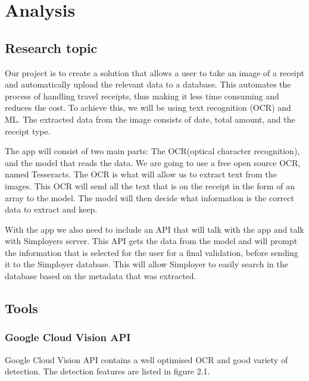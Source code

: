 \cleardoublepage
\chapter{Analysis}
\label{ch:analysis}

\section{Research topic}\label{sec:research-topic}

Our project is to create a solution that allows a user to take an image of a receipt and automatically upload the relevant data to a database.
This automates the process of handling travel receipts, thus making it less time consuming and reduces the cost.
To achieve this, we will be using text recognition (OCR) and ML\@.
The extracted data from the image consists of date, total amount, and the receipt type.

The app will consist of two main parts: The OCR(optical character recognition), and the model that reads the data.
We are going to use a free open source OCR, named Tesseracts.
The OCR is what will allow us to extract text from the images.
This OCR will send all the text that is on the receipt in the form of an array to the model.
The model will then decide what information is the correct data to extract and keep.

With the app we also need to include an API that will talk with the app and talk with Simployers server.
This API gets the data from the model and will prompt the information that is selected for the user for a final
validation, before sending it to the Simployer database.
This will allow Simployer to easily search in the database based on the metadata that was extracted.

\section{Tools}\label{sec:tools}
\subsection{Google Cloud Vision API}\label{subsec:API_Google}

Google Cloud Vision API contains a well optimised OCR and good variety of detection.
The detection features are listed in figure 2.1.

